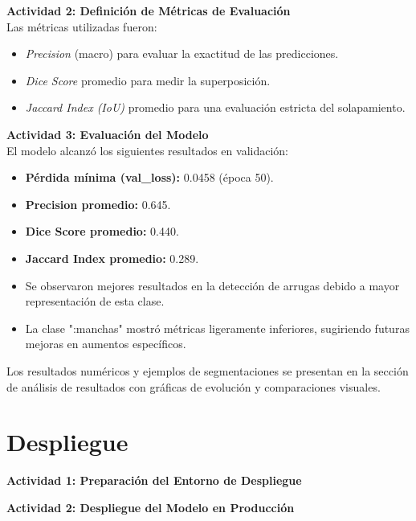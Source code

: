 \textbf{Actividad 2: Definición de Métricas de Evaluación}\\
Las métricas utilizadas fueron:
\begin{itemize}
  \item \textit{Precision} (macro) para evaluar la exactitud de las predicciones.  
  \item \textit{Dice Score} promedio para medir la superposición.  
  \item \textit{Jaccard Index (IoU)} promedio para una evaluación estricta del solapamiento.  
\end{itemize}

\textbf{Actividad 3: Evaluación del Modelo}\\
El modelo alcanzó los siguientes resultados en validación:
\begin{itemize}
  \item \textbf{Pérdida mínima (val\_loss):} 0.0458 (época 50).  
  \item \textbf{Precision promedio:} 0.645.  
  \item \textbf{Dice Score promedio:} 0.440.  
  \item \textbf{Jaccard Index promedio:} 0.289.  
  \item Se observaron mejores resultados en la detección de arrugas debido a mayor representación de esta clase.  
  \item La clase ":manchas" mostró métricas ligeramente inferiores, sugiriendo futuras mejoras en aumentos específicos.  
\end{itemize}

Los resultados numéricos y ejemplos de segmentaciones se presentan en la sección de análisis de resultados con gráficas de evolución y comparaciones visuales.


\section{Despliegue}

\textbf{Actividad 1: Preparación del Entorno de Despliegue}

\textbf{Actividad 2: Despliegue del Modelo en Producción}
